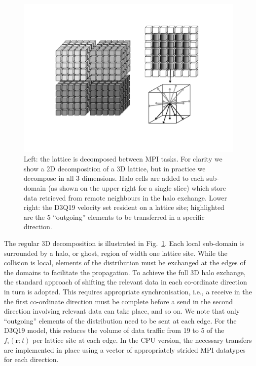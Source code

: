 \begin{figure}[!t]
\centering
\includegraphics[width=12cm]{Chapters/chapter14/figures/decomphalo}
\caption[Parallel decomposition of D3Q19 lattice.]{Left: the lattice is
  decomposed between MPI tasks. For clarity we show a 2D decomposition
  of a 3D lattice, but in practice we decompose in all 3 dimensions.
  Halo cells are added to each sub-domain (as shown on the upper right
  for a single slice) which store data retrieved from remote
  neighbours in the halo exchange. Lower right: the D3Q19 velocity set
  resident on a lattice site; highlighted are the 5 ``outgoing''
  elements to be transferred in a specific direction.}
\label{ch14:fig:decomphalo}
\end{figure}


The regular 3D decomposition is illustrated in Fig.~\ref{ch14:fig:decomphalo}.
Each local sub-domain is surrounded by a halo, or ghost, region of width one
lattice site. While the collision is local, elements of the distribution
must be exchanged at the edges of the domains to facilitate the propagation.
To achieve the full 3D halo exchange, the standard approach of shifting the
relevant data in each co-ordinate direction in turn is adopted. This
requires appropriate synchronisation, i.e., a receive in the the first
co-ordinate direction must be complete before a send in the second direction
involving relevant data can take place, and so on. We note that only
``outgoing'' elements of the distribution need to be sent at each edge.
For the D3Q19 model, this reduces the volume of data traffic from 19 to
5 of the $f_i(\mathbf{r};t)$ per lattice site at each edge. In the CPU
version, the necessary transfers are implemented in place using
a vector of appropriately strided MPI datatypes for each direction.


